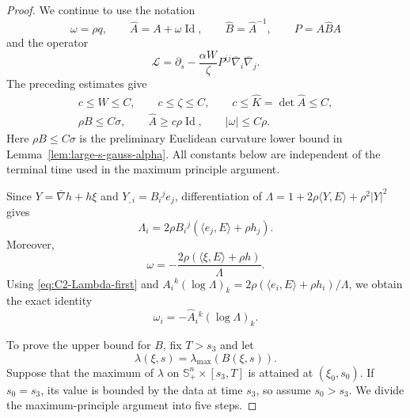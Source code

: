 \documentclass[11pt, reqno]{amsart}
\theoremstyle{remark}
\theoremstyle{definition}
\numberwithin{equation}{section}
\newcommand{\Id}{\operatorname{Id}}
\begin{document}
\begin{proof}
We continue to use the notation
\begin{equation*}
    \omega=\rho q,
    \qquad
    \widehat A=A+\omega\Id,
    \qquad
    \widehat B=\widehat A^{-1},
    \qquad
    P=A\widehat B A
\end{equation*}
and the operator
\begin{equation*}
        \mathcal L
        =\partial_s-\frac{\alpha W}{\zeta}
          P^{ij}\overline{\nabla}_i\overline{\nabla}_j.
\end{equation*}
The preceding estimates give
\begin{equation}\label{eq:C2-input-estimates}
\begin{gathered}
        c\le W\le C,
        \qquad c\le\zeta\le C,
        \qquad c\le\widehat K=\det\widehat A\le C,\\
        \rho B\le C\sigma,
        \qquad \widehat A\ge c\rho\Id,
        \qquad |\omega|\le C\rho.
\end{gathered}
\end{equation}
Here $\rho B\le C\sigma$ is the preliminary Euclidean curvature lower bound in Lemma~\ref{lem:large-s-gauss-alpha}. All constants below are independent of the terminal time used in the maximum principle argument.

Since $Y=\overline{\nabla} h+h\xi$ and $Y_{,i}=B_i{}^j e_j$, differentiation
of $\Lambda=1+2\rho\langle Y,E\rangle+\rho^2|Y|^2$ gives
\begin{equation}\label{eq:C2-Lambda-first}
        \Lambda_i=2\rho B_i{}^j(\langle e_j,E \rangle + \rho h_j).
\end{equation}
Moreover,
\begin{equation*}
        \omega=-\frac{2\rho(\langle\xi,E\rangle+\rho h)}{\Lambda}.
\end{equation*}
Using \eqref{eq:C2-Lambda-first} and
$A_i{}^k(\log\Lambda)_k=2\rho (\langle e_i,E\rangle+\rho h_i)/\Lambda$, we obtain the exact identity
\begin{equation}\label{eq:C2-omega-gradient-identity}
        \omega_i=-\widehat A_i{}^k(\log\Lambda)_k.
\end{equation}

To prove the upper bound for $B$, fix $T>s_3$ and let
\begin{equation*}
        \lambda(\xi,s)=\lambda_{\max}(B(\xi,s)).
\end{equation*}
Suppose that the maximum of $\lambda$ on
$\mathbb{S}^n_+\times[s_3,T]$ is attained at $(\xi_0,s_0)$.  If
$s_0=s_3$, its value is bounded by the data at time $s_3$, so assume
$s_0>s_3$. We divide the maximum-principle argument into five steps.


\end{proof}
\end{document}
